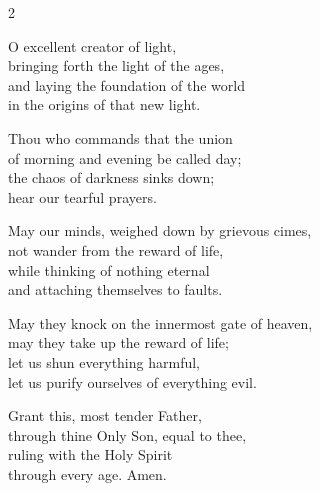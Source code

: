 \begin{multicols}{2}
\begin{enpars}
O excellent creator of light,\\
bringing forth the light of the ages,\\
and laying the foundation of the world\\
in the origins of that new light.

Thou who commands that the union\\
of morning and evening be called day;\\
the chaos of darkness sinks down;\\
hear our tearful prayers.

May our minds, weighed down by grievous cimes,\\
not wander from the reward of life,\\
while thinking of nothing eternal\\
and attaching themselves to faults.

May they knock on the innermost gate of heaven,\\
may they take up the reward of life;\\
let us shun everything harmful,\\
let us purify ourselves of everything evil.

Grant this, most tender Father,\\
through thine Only Son, equal to thee,\\
ruling with the Holy Spirit\\
through every age. Amen.
\end{enpars}
\end{multicols}